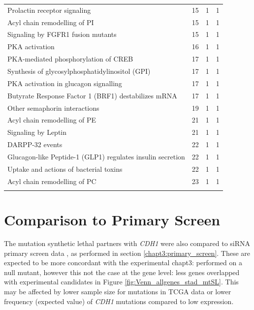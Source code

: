 \begin{table}[!Hp]
{\begin{tabular}{lccc}
  \rowcolor{Cluster_Red!15}
  Prolactin receptor signaling &  15 &   1 &   1 \\ 
  \rowcolor{Cluster_Red!20}
  Acyl chain remodelling of PI &  15 &   1 &   1 \\ 
  \rowcolor{Cluster_Red!15}
  Signaling by FGFR1 fusion mutants &  15 &   1 &   1 \\ 
  \rowcolor{Cluster_Red!20}
  PKA activation &  16 &   1 &   1 \\ 
  \rowcolor{Cluster_Red!15}
  PKA-mediated phosphorylation of CREB &  17 &   1 &   1 \\ 
  \rowcolor{Cluster_Red!20}
  Synthesis of glycosylphosphatidylinositol (GPI) &  17 &   1 &   1 \\ 
  \rowcolor{Cluster_Red!15}
  PKA activation in glucagon signalling &  17 &   1 &   1 \\ 
  \rowcolor{Cluster_Red!20}
  Butyrate Response Factor 1 (BRF1) destabilizes mRNA &  17 &   1 &   1 \\ 
  \rowcolor{Cluster_Red!15}
  Other semaphorin interactions &  19 &   1 &   1 \\ 
  \rowcolor{Cluster_Red!20}
  Acyl chain remodelling of PE &  21 &   1 &   1 \\ 
  \rowcolor{Cluster_Red!15}
  Signaling by Leptin &  21 &   1 &   1 \\ 
  \rowcolor{Cluster_Red!20}
  DARPP-32 events &  22 &   1 &   1 \\ 
  \rowcolor{Cluster_Red!15}
  Glucagon-like Peptide-1 (GLP1) regulates insulin secretion &  22 &   1 &   1 \\ 
  \rowcolor{Cluster_Red!20}
  Uptake and actions of bacterial toxins &  22 &   1 &   1 \\ 
  \rowcolor{Cluster_Red!15}
  Acyl chain remodelling of PC &  23 &   1 &   1 \\ 
  \hline
  \\
\end{tabular}
}
\end{table}

\FloatBarrier

\section{Comparison to Primary Screen} \label{appendix:compare_mtSL_genes_stad}

The mutation synthetic lethal partners with \textit{CDH1} were also compared to siRNA primary screen data \citep{Telford2015}, as performed in section \ref{chapt3:primary_screen}. These are expected to be more concordant with the experimental chapt3: performed on a null mutant, however this not the case at the gene level: less genes overlapped with experimental candidates in Figure \ref{fig:Venn_allgenes_stad_mtSL}. This may be affected by lower sample size for mutations in TCGA data or lower frequency (expected value) of \textit{CDH1} mutations compared to low expression. 

